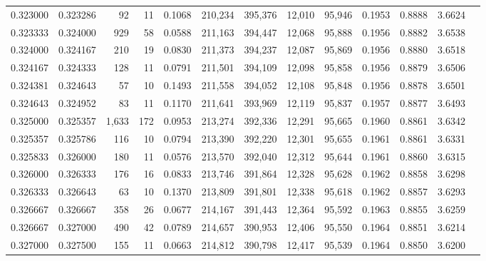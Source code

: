 \begin{tabular}{rrrrrrrrrrrrr}
0.323000 & 0.323286 &    92 &  11 &                                     0.1068 & 210,234 & 395,376 &  12,010 &  95,946 & 0.1953 & 0.8888 & 3.6624 \\
0.323333 & 0.324000 &   929 &  58 &                                     0.0588 & 211,163 & 394,447 &  12,068 &  95,888 & 0.1956 & 0.8882 & 3.6538 \\
0.324000 & 0.324167 &   210 &  19 &                                     0.0830 & 211,373 & 394,237 &  12,087 &  95,869 & 0.1956 & 0.8880 & 3.6518 \\
0.324167 & 0.324333 &   128 &  11 &                                     0.0791 & 211,501 & 394,109 &  12,098 &  95,858 & 0.1956 & 0.8879 & 3.6506 \\
0.324381 & 0.324643 &    57 &  10 &                                     0.1493 & 211,558 & 394,052 &  12,108 &  95,848 & 0.1956 & 0.8878 & 3.6501 \\
0.324643 & 0.324952 &    83 &  11 &                                     0.1170 & 211,641 & 393,969 &  12,119 &  95,837 & 0.1957 & 0.8877 & 3.6493 \\
0.325000 & 0.325357 & 1,633 & 172 &                                     0.0953 & 213,274 & 392,336 &  12,291 &  95,665 & 0.1960 & 0.8861 & 3.6342 \\
0.325357 & 0.325786 &   116 &  10 &                                     0.0794 & 213,390 & 392,220 &  12,301 &  95,655 & 0.1961 & 0.8861 & 3.6331 \\
0.325833 & 0.326000 &   180 &  11 &                                     0.0576 & 213,570 & 392,040 &  12,312 &  95,644 & 0.1961 & 0.8860 & 3.6315 \\
0.326000 & 0.326333 &   176 &  16 &                                     0.0833 & 213,746 & 391,864 &  12,328 &  95,628 & 0.1962 & 0.8858 & 3.6298 \\
0.326333 & 0.326643 &    63 &  10 &                                     0.1370 & 213,809 & 391,801 &  12,338 &  95,618 & 0.1962 & 0.8857 & 3.6293 \\
0.326667 & 0.326667 &   358 &  26 &                                     0.0677 & 214,167 & 391,443 &  12,364 &  95,592 & 0.1963 & 0.8855 & 3.6259 \\
0.326667 & 0.327000 &   490 &  42 &                                     0.0789 & 214,657 & 390,953 &  12,406 &  95,550 & 0.1964 & 0.8851 & 3.6214 \\
0.327000 & 0.327500 &   155 &  11 &                                     0.0663 & 214,812 & 390,798 &  12,417 &  95,539 & 0.1964 & 0.8850 & 3.6200 \\

\end{tabular}
